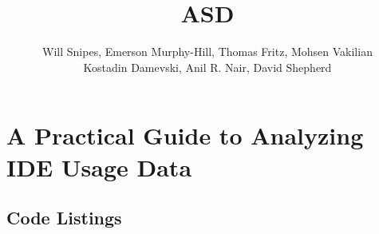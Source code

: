 \documentclass{book}
\begin{document}
\title{ASD}

\chapter{A Practical Guide to Analyzing IDE Usage Data\vspace{-0ex}}
\author{
Will Snipes, Emerson Murphy-Hill,
Thomas Fritz, Mohsen Vakilian \\
Kostadin Damevski,
Anil R. Nair, David Shepherd
}
\maketitle
\thispagestyle{empty}
\pagestyle{empty}



\pagebreak



\pagebreak

\section{Code Listings}



 
\end{document}

